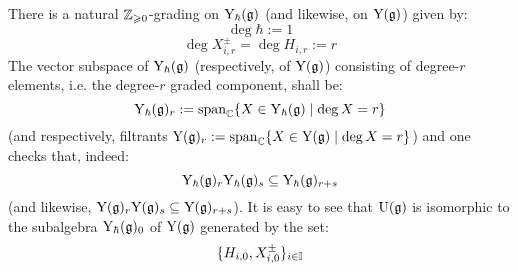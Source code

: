         \begin{remark} \label{remark: the_degree_grading_on_finite_type_yangians}
            There is a natural $\mathbb{Z}_{\geqslant 0}$-grading on $\mathrm{Y}_{\hbar}(\mathfrak{g})$ (and likewise, on $\mathrm{Y}(\mathfrak{g})$) given by:
                $$\deg \hbar := 1$$
                $$\deg X_{i, r}^{\pm} = \deg H_{i, r} := r$$
            The vector subspace of $\mathrm{Y}_{\hbar}(\mathfrak{g})$ (respectively, of $\mathrm{Y}(\mathfrak{g})$) consisting of degree-$r$ elements, i.e. the degree-$r$ graded component, shall be:
                $$\mathrm{Y}_{\hbar}(\mathfrak{g})_r := \operatorname{span}_{\mathbb{C}} \{ X \in \mathrm{Y}_{\hbar}(\mathfrak{g}) \mid \deg X = r \}$$
            (and respectively, filtrants $\mathrm{Y}(\mathfrak{g})_r := \operatorname{span}_{\mathbb{C}} \{ X \in \mathrm{Y}(\mathfrak{g}) \mid \deg X = r \}$) and one checks that, indeed:
                $$\mathrm{Y}_{\hbar}(\mathfrak{g})_r \mathrm{Y}_{\hbar}(\mathfrak{g})_s \subseteq \mathrm{Y}_{\hbar}(\mathfrak{g})_{r + s}$$
            (and likewise, $\mathrm{Y}(\mathfrak{g})_r \mathrm{Y}(\mathfrak{g})_s \subseteq \mathrm{Y}(\mathfrak{g})_{r + s}$). It is easy to see that $\mathrm{U}(\mathfrak{g})$ is isomorphic to the subalgebra $\mathrm{Y}_{\hbar}(\mathfrak{g})_0$ of $\mathrm{Y}(\mathfrak{g})$ generated by the set:
                $$\{ H_{i, 0}, X_{i, 0}^{\pm} \}_{i \in \mathbb{I}}$$
        \end{remark}

